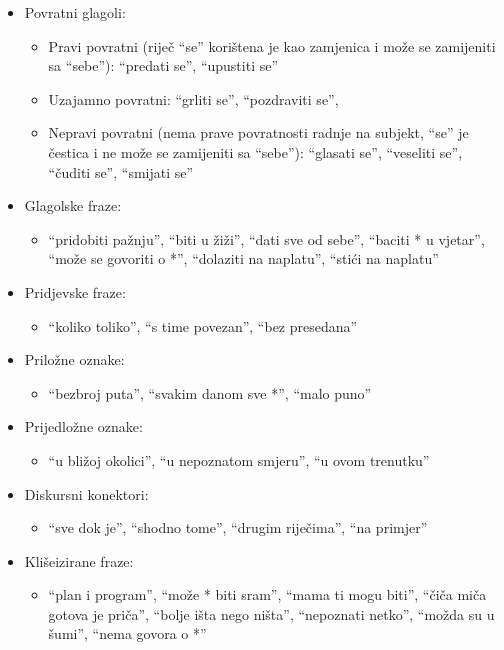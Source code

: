 \documentclass[12pt]{article}
\begin{document}
\begin{itemize}
\item Povratni glagoli:
\begin{itemize}
\item Pravi povratni (riječ ``se'' korištena je kao zamjenica i može se zamijeniti sa ``sebe''): ``predati
se'', ``upustiti se''
\item Uzajamno povratni: ``grliti se'', ``pozdraviti se'',
\item Nepravi povratni (nema prave povratnosti radnje na subjekt, ``se'' je  čestica i ne može se
zamijeniti sa ``sebe''): ``glasati se'', ``veseliti se'', ``čuditi se'', ``smijati se''
\end{itemize}
\item Glagolske fraze:
\begin{itemize}
\item ``pridobiti pažnju'', ``biti u žiži'', ``dati sve od sebe'', ``baciti * u vjetar'', ``može se govoriti
o *'', ``dolaziti na naplatu'', ``stići na naplatu''
\end{itemize}
\item Pridjevske fraze:
\begin{itemize}
\item ``koliko toliko'', ``s time povezan'', ``bez presedana''
\end{itemize}
\item Priložne oznake:
\begin{itemize}
\item ``bezbroj puta'', ``svakim danom sve *'', ``malo puno''
\end{itemize}
\item Prijedložne oznake:
\begin{itemize}
\item ``u bližoj okolici'', ``u nepoznatom smjeru'', ``u ovom trenutku''
\end{itemize}
\item Diskursni konektori:
\begin{itemize}
\item ``sve dok je'', ``shodno tome'', ``drugim riječima'', ``na primjer''
\end{itemize}
\item Klišeizirane fraze:
\begin{itemize}
\item ``plan i program'', ``može * biti sram'', ``mama ti mogu biti'', ``čiča miča gotova je priča'',
``bolje išta nego ništa'', ``nepoznati netko'', ``možda su u šumi'', ``nema govora o *''
\end{itemize}
\end{itemize}
\end{document}
